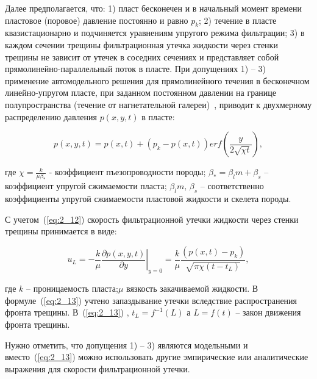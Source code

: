 Далее предполагается, что: 1) пласт бесконечен и в начальный момент времени пластовое (поровое) давление постоянно и равно $p_k$; 2) течение в пласте квазистационарно и подчиняется уравнениям упругого режима фильтрации; 3) в каждом сечении трещины фильтрационная утечка жидкости через стенки трещины не зависит от утечек в соседних сечениях и представляет собой прямолинейно-параллельный поток в пласте. При допущениях 1) – 3) применение автомодельного решения для прямолинейного течения в бесконечном линейно-упругом пласте, при заданном постоянном давлении на границе полупространства (течение от нагнетательной галереи)~\cite{Smirn_Tag1}, приводит к двухмерному распределению давления $p\left(x,y,t\right)$ в пласте:

\begin{equation}

p\left(x,y,t\right) = p \left(x,t\right) + \left(p_k - p \left(x,t\right)\right) erf \left(\frac{y}{2 \sqrt{\chi t}}\right) , \label{eq:2_12}

\end{equation}

где $\chi = \frac{k}{\mu \beta_*}$ - коэффициент пъезопроводности породы; $\beta_* = \beta_l m + \beta_s$ – коэффициент упругой сжимаемости пласта; $\beta_l m,\, \beta_s$ – соответственно коэффициенты упругой сжимаемости пластовой жидкости и скелета породы.



С учетом~(\ref{eq:2_12}) скорость фильтрационной утечки жидкости через стенки трещины принимается в виде:

\begin{equation}

u_L = \left.-\frac{k}{\mu} \frac{\partial p\left(x,y,t\right)}{\partial y}\right|_{y=0} = \frac{k}{\mu} \frac{\left(p \left(x,t\right) - p_k\right)}{\sqrt{\pi \chi \left(t-t_L\right)}}, \label{eq:2_13}

\end{equation}

где $k$ – проницаемость пласта;$\mu$  вязкость закачиваемой жидкости. В формуле~(\ref{eq:2_13}) учтено запаздывание утечки вследствие распространения фронта трещины. В~(\ref{eq:2_13}) , $t_L = f^{-1} (L)$ а $L= f(t)$  – закон движения фронта трещины.



Нужно отметить, что допущения 1) – 3) являются модельными и вместо~(\ref{eq:2_13}) можно использовать другие эмпирические или аналитические выражения для скорости фильтрационной утечки.

